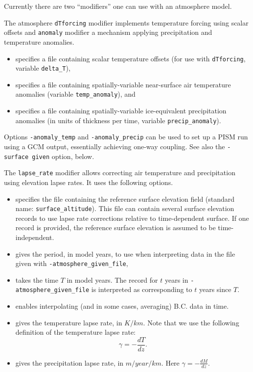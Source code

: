   Currently there are two ``modifiers'' one can use with an atmosphere model.

  The atmosphere \texttt{dTforcing} modifier implements temperature forcing using scalar offsets and \texttt{anomaly} modifier a mechanism applying precipitation and temperature anomalies.
  \begin{itemize}
  \item {} specifies a file containing scalar temperature offsets (for use with \texttt{dTforcing}, variable \texttt{delta_T}), 
  \item {} specifies a file containing spatially-variable near-surface air temperature anomalies (variable \texttt{temp_anomaly}), and
  \item {} specifies a file containing spatially-variable ice-equivalent precipitation anomalies (in units of thickness per time, variable \texttt{precip_anomaly}).
  \end{itemize}

  Options \texttt{-anomaly_temp} and \texttt{-anomaly_precip} can be used to set up a PISM run using a GCM output, essentially achieving one-way coupling. See also the \texttt{-surface given} option, below.

 The \texttt{lapse_rate} modifier allows correcting air temperature and precipitation using elevation lapse rates. It uses the following options.
  \begin{itemize}
  \item {} specifies the file containing the reference surface elevation field (standard name: \texttt{surface_altitude}). This file can contain several surface elevation records to use lapse rate corrections relative to time-dependent surface. If one record is provided, the reference surface elevation is assumed to be time-independent.
  \item {} gives the period, in model years, to use when interpreting data in the file given with \texttt{-atmosphere_given_file},
  \item {} takes the time $T$ in model years. The record for $t$ years in \texttt{-atmosphere_given_file} is interpreted as corresponding to $t$ years since $T$.
  \item {} enables interpolating (and in some cases, averaging) B.C. data in time.
  \item {} gives the temperature lapse rate, in $K/km$. Note that we use the following definition of the temperature lapse rate:
    \begin{displaymath}
      \gamma = -\frac{dT}{dz}.
    \end{displaymath}
  \item {} gives the precipitation lapse rate, in $m/year/km$. Here $\gamma = -\frac{dM}{dz}$.
  \end{itemize}

